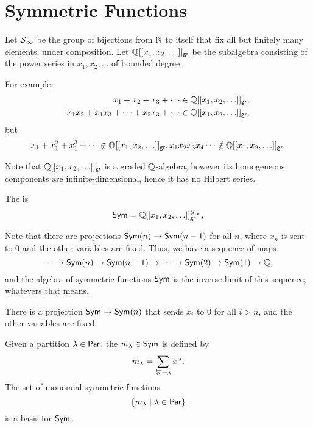 \chapter{Symmetric Functions}

Let \(\operatorname{\mathcal{S}}_\infty\) be the group of bijections from \(\mathbb{N}\) to itself that fix all but finitely many elements, under composition.
Let \(\mathbb{Q}[[x_1, x_2, \ldots]]_{\mathsf{gr}}\)
be the subalgebra consisting of the power series in \(x_1, x_2, \ldots\)
of bounded degree.

For example,
\begin{align*}
    x_1 + x_2 + x_3 + \cdots                   & \in \mathbb{Q}[[x_1, x_2, \ldots]]_{\mathsf{gr}}, \\
    x_1x_2 + x_1x_3 + \cdots + x_2x_3 + \cdots & \in \mathbb{Q}[[x_1, x_2, \ldots]]_{\mathsf{gr}},
\end{align*}
but
\begin{align*}
    x_1 + x_1^2 + x_1^3 + \cdots \notin \mathbb{Q}[[x_1, x_2, \ldots]]_{\mathsf{gr}},
    x_1x_2x_3x_4\cdots \notin \mathbb{Q}[[x_1, x_2, \ldots]]_{\mathsf{gr}}.
\end{align*}

Note that \(\mathbb{Q}[[x_1, x_2, \ldots]]_{\mathsf{gr}}\) is a graded \(\mathbb{Q}\)-algebra,
however its homogeneous components are infinite-dimensional,
hence it has no Hilbert series.

\begin{definition}
    The  is
    \[
        \operatorname{\mathsf{Sym}} = \mathbb{Q}[[x_1, x_2, \ldots]]_{\mathsf{gr}}^{\operatorname{\mathcal{S}}_\infty},
    \]
\end{definition}

Note that there are projections \(\operatorname{\mathsf{Sym}}(n) \to \operatorname{\mathsf{Sym}}(n-1)\) for all \(n\),
where \(x_n\) is sent to \(0\) and the other variables are fixed.
Thus, we have a sequence of maps
\[
    \cdots \to \operatorname{\mathsf{Sym}}(n) \to \operatorname{\mathsf{Sym}}(n-1) \to \cdots \to \operatorname{\mathsf{Sym}}(2) \to \operatorname{\mathsf{Sym}}(1) \to \mathbb{Q},
\]
and the algebra of symmetric functions \(\operatorname{\mathsf{Sym}}\) is the inverse limit of this sequence; whatevers that means.

There is a projection \(\operatorname{\mathsf{Sym}} \to \operatorname{\mathsf{Sym}}(n)\) that sends \(x_i\) to \(0\) for all \(i > n\), and the other variables are fixed.

Given a partition \(\lambda \in \operatorname{\mathsf{Par}}\),
the  \(m_\lambda \in \operatorname{\mathsf{Sym}}\) is defined by
\[
    m_\lambda = \sum_{\overleftarrow{\alpha} = \lambda} x^\alpha.
\]
The set of monomial symmetric functions
\[
    \{ m_\lambda \mid \lambda \in \operatorname{\mathsf{Par}} \}
\]
is a basis for \(\operatorname{\mathsf{Sym}}\).

